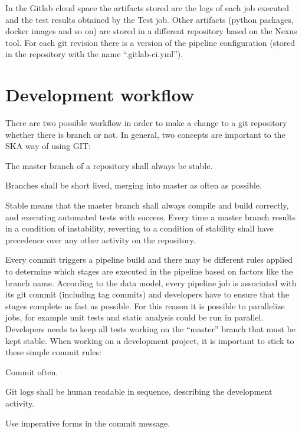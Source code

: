 \documentclass[a4paper,
               keeplastbox,   %
               ]{jacow}
\begin{document}
In the Gitlab cloud space the artifacts stored are the logs of each job executed and the test results obtained by the Test job. Other artifacts (python packages, docker images and so on) are stored in a different repository based on the Nexus tool. For each git revision there is a version of the pipeline configuration (stored in the repository with the name “.gitlab-ci.yml”). 


\section{Development workflow}
There are two possible workflow in order to make a change to a git repository whether there is branch or not. In general, two concepts are important to the SKA way of using GIT:
\begin{Itemize}
    \item The master branch of a repository shall always be stable.
    \item Branches shall be short lived, merging into master as often as possible.
\end{Itemize}

Stable means that the master branch shall always compile and build correctly, and executing automated tests with success. Every time a master branch results in a condition of instability, reverting to a condition of stability shall have precedence over any other activity on the repository.

Every commit triggers a pipeline build and there may be different rules applied to determine which stages are executed in the pipeline based on factors like the branch name. According to the data model, every pipeline job is associated with its git commit (including tag commits) and developers have to ensure that the stages complete as fast as possible. For this reason it is possible to parallelize jobs, for example unit tests and static analysis could be run in parallel. Developers needs to keep all tests working  on the “master” branch that must be kept stable.
When working on a development project, it is important to stick to these simple commit rules:
\begin{Itemize}
    \item Commit often.
    \item Git logs shall be human readable in sequence, describing the development activity.
    \item Use imperative forms in the commit message.
\end{Itemize}
\end{document}
